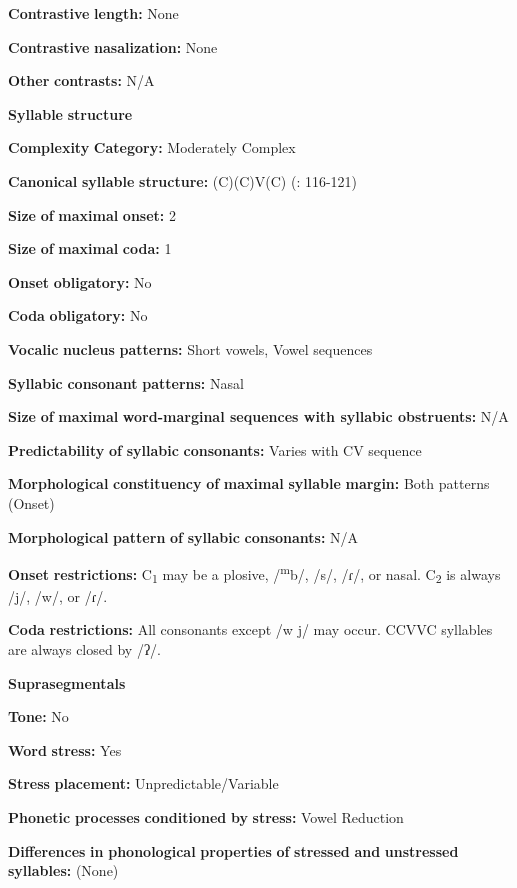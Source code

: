 \textbf{Contrastive} \textbf{length:} None

\textbf{Contrastive} \textbf{nasalization:} None

\textbf{Other} \textbf{contrasts:} N/A

\textbf{Syllable} \textbf{structure}

\textbf{Complexity} \textbf{Category:} Moderately Complex

\textbf{Canonical} \textbf{syllable} \textbf{structure:} (C)(C)V(C) (\citealt{SandersSanders1980}: 116-121)

\textbf{Size} \textbf{of} \textbf{maximal} \textbf{onset:} 2

\textbf{Size} \textbf{of} \textbf{maximal} \textbf{coda:} 1

\textbf{Onset} \textbf{obligatory:} No

\textbf{Coda} \textbf{obligatory:} No

\textbf{Vocalic} \textbf{nucleus} \textbf{patterns:} Short vowels, Vowel sequences

\textbf{Syllabic} \textbf{consonant} \textbf{patterns:} Nasal

\textbf{Size} \textbf{of} \textbf{maximal} \textbf{word{}-marginal sequences with syllabic obstruents:} N/A

\textbf{Predictability} \textbf{of} \textbf{syllabic} \textbf{consonants:} Varies with CV sequence

\textbf{Morphological} \textbf{constituency} \textbf{of} \textbf{maximal} \textbf{syllable} \textbf{margin:} Both patterns (Onset)

\textbf{Morphological} \textbf{pattern} \textbf{of} \textbf{syllabic} \textbf{consonants:} N/A

\textbf{Onset} \textbf{restrictions:} C\textsubscript{1} may be a plosive, /\textsuperscript{m}b/, /s/, /ɾ/, or nasal. C\textsubscript{2} is always /j/, /w/, or /ɾ/.

\textbf{Coda} \textbf{restrictions:} All consonants except /w j/ may occur. CCVVC syllables are always closed by /ʔ/.

\textbf{Suprasegmentals}

\textbf{Tone:} No

\textbf{Word} \textbf{stress:} Yes

\textbf{Stress} \textbf{placement:} Unpredictable/Variable

\textbf{Phonetic} \textbf{processes} \textbf{conditioned} \textbf{by} \textbf{stress:} Vowel Reduction

\textbf{Differences} \textbf{in} \textbf{phonological} \textbf{properties} \textbf{of} \textbf{stressed} \textbf{and} \textbf{unstressed} \textbf{syllables:} (None)

